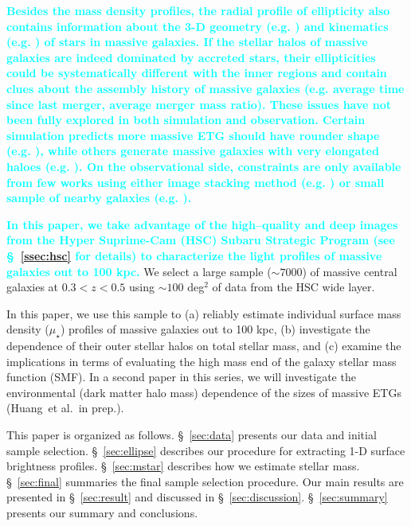 \documentclass[a4paper,fleqn,usenatbib]{mnras}
\def\etal{{\ et al.~}}
\def\mden{{$\mu_{\star}$}}
\newcommand{\song}[1]{\textcolor{cyan}{\textbf{#1}}}
\begin{document}
    \song{
    Besides the mass density profiles, the radial profile of ellipticity also 
    contains information about the 3-D geometry (e.g. \citealt{Tremblay1995, 
    Tremblay1996, Chang2013, RodriguezPadilla2013, Mitsuda2017}) and kinematics 
    (e.g. \citealt{Cappellari2012, Weijmans2014}) of stars in massive galaxies.
    If the stellar halos of massive galaxies are indeed dominated by accreted 
    stars, their ellipticities could be systematically different with the inner 
    regions and contain clues about the assembly history of massive galaxies 
    (e.g. average time since last merger, average merger mass ratio).
    These issues have not been fully explored in both simulation and observation.
    Certain simulation predicts more massive ETG should have rounder shape
    (e.g. \citealt{Wu2014}), while others generate massive galaxies with very 
    elongated haloes (e.g. \citealt{Li2017}).  
    On the observational side, constraints are only available from few works 
    using either image stacking method (e.g. \citealt{Tal2011, dSouza2015}) or 
    small sample of nearby galaxies (e.g. \citealt{Spavone2017}).
    }
        
    \song{
    In this paper, we take advantage of the high--quality and deep images from the 
    Hyper Suprime-Cam (HSC) Subaru Strategic Program \citep[SSP,][]{HSC-DR1} 
    (see \S~\ref{ssec:hsc} for details) to characterize the light profiles of 
    massive galaxies out to 100 kpc. 
    }
    We select a large sample (${\sim} 7000$) of massive central galaxies 
    at $0.3 < z < 0.5$ using ${\sim} 100$ deg$^2$ of data from the HSC wide layer. 
    
    In this paper, we use this sample to 
    (a) reliably estimate individual surface mass density (\mden{}) profiles of 
    massive galaxies out to 100 kpc, 
    (b) investigate the dependence of their outer stellar halos on total stellar 
    mass, and 
    (c) examine the implications in terms of evaluating the high mass end of the 
    galaxy stellar mass function (SMF). 
    In a second paper in this series, we will investigate the environmental 
    (dark matter halo mass) dependence of the sizes of massive ETGs 
    (Huang\etal in prep.).
    
    This paper is organized as follows. 
    \S~\ref{sec:data} presents our data and initial sample selection. 
    \S~\ref{sec:ellipse} describes our procedure for extracting 1-D surface 
    brightness profiles. 
    \S~\ref{sec:mstar} describes how we estimate stellar mass.
    \S~\ref{sec:final} summaries the final sample selection procedure. 
    Our main results are presented in \S~\ref{sec:result} and discussed in 
    \S~\ref{sec:discussion}. 
    \S~\ref{sec:summary} presents our summary and conclusions.
\end{document}
